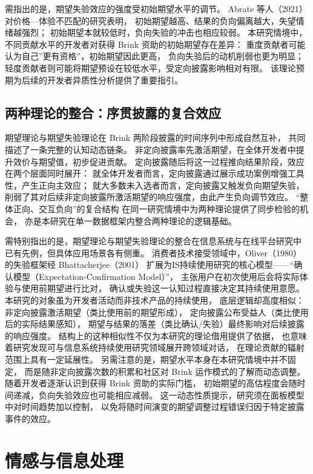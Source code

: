 需指出的是，期望失验效应的强度受初始期望水平的调节。
Abrate 等人（2021）对价格—体验不匹配的研究表明，
初始期望越高、结果的负向偏离越大，失望情绪越强烈；
初始期望本就较低时，负向失验的冲击也相应较弱\cite{abrate2021relationship}。
本研究情境中，不同贡献水平的开发者对获得 Brink 资助的初始期望存在差异：
重度贡献者可能认为自己”更有资格”，初始期望因此更高，
负向失验后的动机削弱也更为明显；
轻度贡献者则可能将期望预设在较低水平，受定向披露影响相对有限。
该理论预期为后续的开发者异质性分析提供了重要指引。

\subsection{两种理论的整合：序贯披露的复合效应}

期望理论与期望失验理论在 Brink 两阶段披露的时间序列中形成自然互补，
共同描述了一条完整的认知动态链条。
非定向披露率先激活期望，在全体开发者中提升效价与期望值，初步促进贡献。
定向披露随后将这一过程推向结果阶段，效应在两个层面同时展开：
就全体开发者而言，定向披露通过展示成功案例增强工具性，产生正向主效应；
就大多数未入选者而言，定向披露又触发负向期望失验，
削弱了其对后续非定向披露所激活期望的响应强度，由此产生负向调节效应。
“整体正向、交互负向”的复合结构
在同一研究情境中为两种理论提供了同步检验的机会，
亦是本研究在单一数据框架内整合两种理论的逻辑基础。

需特别指出的是，期望理论与期望失验理论的整合在信息系统与在线平台研究中
已有先例，但具体应用场景各有侧重。
消费者技术接受领域中，Oliver（1980）的失验框架经 Bhattacherjee（2001）\cite{bhattacherjee2001understanding}
扩展为IS持续使用研究的核心模型——“确认模型（Expectation-Confirmation Model）”，
主张用户在初次使用后会将实际体验与使用前期望进行比对，
确认或失验这一认知过程直接决定其持续使用意愿。
本研究的对象虽为开发者活动而非技术产品的持续使用，
底层逻辑却高度相似：非定向披露激活期望（类比使用前的期望形成），
定向披露公布受益人（类比使用后的实际结果感知），
期望与结果的落差（类比确认/失验）最终影响对后续披露的响应强度。
结构上的这种相似性不仅为本研究的理论借用提供了依据，
也意味着研究发现可与信息系统持续使用研究领域展开跨领域对话，
在理论贡献的辐射范围上具有一定延展性。
另需注意的是，期望水平本身在本研究情境中并不固定，
而是随非定向披露次数的积累和社区对 Brink 运作模式的了解而动态调整。
随着开发者逐渐认识到获得 Brink 资助的实际门槛，
初始期望的高估程度会随时间递减，负向失验效应也可能相应减弱。
这一动态性质提示，研究须在面板模型中对时间趋势加以控制，
以免将随时间演变的期望调整过程错误归因于特定披露事件的效应。

\section{情感与信息处理}

